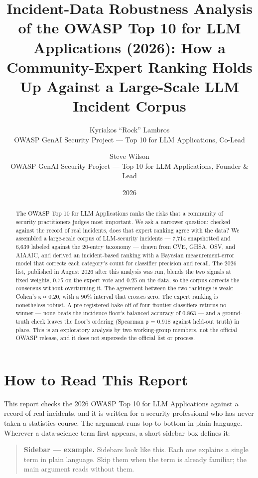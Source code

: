 \documentclass[11pt]{article}
\title{Incident-Data Robustness Analysis of the OWASP Top 10 for LLM
Applications (2026): How a Community-Expert Ranking Holds Up Against a
Large-Scale LLM Incident Corpus}
\author{Kyriakos ``Rock'' Lambros\\{\small OWASP GenAI Security Project
--- Top 10 for LLM Applications, Co-Lead} \and Steve
Wilson\\{\small OWASP GenAI Security Project --- Top 10 for LLM
Applications, Founder \& Lead}}
\date{2026}
\begin{document}
\maketitle
\begin{abstract}
The OWASP Top 10 for LLM Applications ranks the risks that a community
of security practitioners judges most important. We ask a narrower
question: checked against the record of real incidents, does that expert
ranking agree with the data? We assembled a large-scale corpus of
LLM-security incidents --- 7,714 snapshotted and 6,639 labeled against
the 20-entry taxonomy --- drawn from CVE, GHSA, OSV, and AIAAIC, and
derived an incident-based ranking with a Bayesian measurement-error
model that corrects each category's count for classifier precision and
recall. The 2026 list, published in August 2026 after this analysis was
run, blends the two signals at fixed weights, 0.75 on the expert vote
and 0.25 on the data, so the corpus corrects the consensus without
overturning it. The agreement between the two rankings is weak: Cohen's
κ ≈ 0.20, with a 90\% interval that crosses zero. The expert ranking is
nonetheless robust. A pre-registered bake-off of four frontier
classifiers returns no winner --- none beats the incidence floor's
balanced accuracy of 0.863 --- and a ground-truth check leaves the
floor's ordering (Spearman ρ = 0.918 against held-out truth) in place.
This is an exploratory analysis by two working-group members, not the
official OWASP release, and it does not supersede the official list or
process.
\end{abstract}

{
\setcounter{tocdepth}{2}
\tableofcontents
}
\section{How to Read This Report}\label{how-to-read-this-report}

This report checks the 2026 OWASP Top 10 for LLM Applications against a
record of real incidents, and it is written for a security professional
who has never taken a statistics course. The argument runs top to bottom
in plain language. Wherever a data-science term first appears, a short
sidebar box defines it:

\begin{quote}
\textbf{Sidebar --- example.} Sidebars look like this. Each one explains
a single term in plain language. Skip them when the term is already
familiar; the main argument reads without them.
\end{quote}
\end{document}
